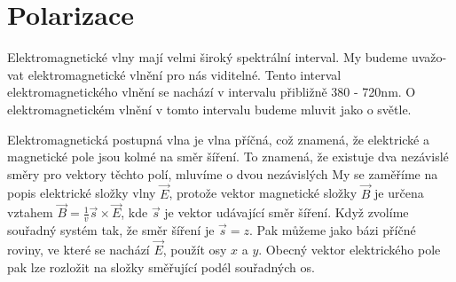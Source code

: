 \documentclass[a4paper]{article}
\numberwithin{equation}{section}
\begin{document}
	\section{Polarizace}
    Elektromagnetické vlny mají velmi široký spektrální interval. My budeme uvažo-
    \\vat elektromagnetické vlnění pro nás viditelné. Tento interval elektromagnetického vlnění se nachází v intervalu přibližně 380 - 720nm. O elektromagnetickém vlnění v tomto intervalu budeme mluvit jako o světle. \cite{maly}
    \par Elektromagnetická postupná vlna je vlna příčná, což znamená, že elektrické a magnetické pole jsou kolmé na směr šíření. To znamená, že existuje dva nezávislé směry pro vektory těchto polí, mluvíme o dvou nezávislých My se zaměříme na popis elektrické složky vlny $\vec{E}$, protože vektor magnetické složky $\vec{B}$ je určena vztahem $\vec{B}= \frac{1}{v}\vec{s}\times\vec{E}$, kde $\vec{s}$ je vektor udávající směr šíření. Když zvolíme souřadný systém tak, že směr šíření je $\vec{s}=z$. Pak můžeme jako bázi příčné roviny, ve které se nachází $\vec{E}$, použít osy $x$ a $y$. Obecný vektor elektrického pole pak lze rozložit na složky směřující podél souřadných os.
\end{document}
